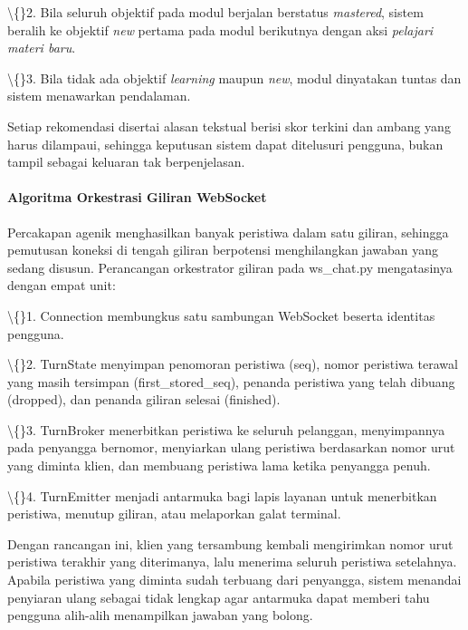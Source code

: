 \documentclass[12pt,a4paper]{article}
\begin{document}
\textbackslash\{\}2. Bila seluruh objektif pada modul berjalan berstatus \textit{mastered}, sistem beralih ke objektif \textit{new} pertama pada modul berikutnya dengan aksi \textit{pelajari materi baru}.



\textbackslash\{\}3. Bila tidak ada objektif \textit{learning} maupun \textit{new}, modul dinyatakan tuntas dan sistem menawarkan pendalaman.



Setiap rekomendasi disertai alasan tekstual berisi skor terkini dan ambang yang harus dilampaui, sehingga keputusan sistem dapat ditelusuri pengguna, bukan tampil sebagai keluaran tak berpenjelasan.



\paragraph*{Algoritma Orkestrasi Giliran WebSocket}

Percakapan agenik menghasilkan banyak peristiwa dalam satu giliran, sehingga pemutusan koneksi di tengah giliran berpotensi menghilangkan jawaban yang sedang disusun. Perancangan orkestrator giliran pada ws\_chat.py mengatasinya dengan empat unit:



\textbackslash\{\}1. Connection membungkus satu sambungan WebSocket beserta identitas pengguna.



\textbackslash\{\}2. TurnState menyimpan penomoran peristiwa (seq), nomor peristiwa terawal yang masih tersimpan (first\_stored\_seq), penanda peristiwa yang telah dibuang (dropped), dan penanda giliran selesai (finished).



\textbackslash\{\}3. TurnBroker menerbitkan peristiwa ke seluruh pelanggan, menyimpannya pada penyangga bernomor, menyiarkan ulang peristiwa berdasarkan nomor urut yang diminta klien, dan membuang peristiwa lama ketika penyangga penuh.



\textbackslash\{\}4. TurnEmitter menjadi antarmuka bagi lapis layanan untuk menerbitkan peristiwa, menutup giliran, atau melaporkan galat terminal.



Dengan rancangan ini, klien yang tersambung kembali mengirimkan nomor urut peristiwa terakhir yang diterimanya, lalu menerima seluruh peristiwa setelahnya. Apabila peristiwa yang diminta sudah terbuang dari penyangga, sistem menandai penyiaran ulang sebagai tidak lengkap agar antarmuka dapat memberi tahu pengguna alih-alih menampilkan jawaban yang bolong.
\end{document}
